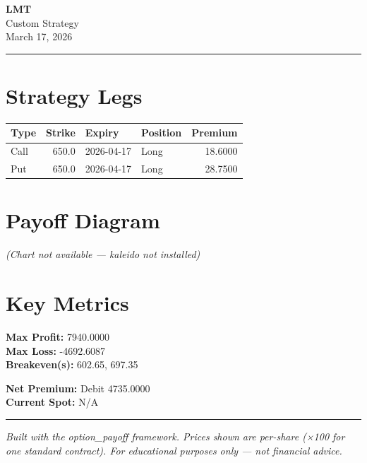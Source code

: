 \documentclass{article}
\begin{document}
\begin{flushright}
  {\large\textbf{LMT}} \\[2pt]
  {\normalsize Custom Strategy} \\[2pt]
  {\small March 17, 2026}
\end{flushright}

\noindent\rule{\linewidth}{0.5pt}
\vspace{6pt}

\section*{Strategy Legs}
\begin{tabular}{@{}lrllr@{}}
  \toprule
  \textbf{Type} & \textbf{Strike} & \textbf{Expiry} & \textbf{Position} & \textbf{Premium} \\
  \midrule
  Call & 650.0 & 2026-04-17 & Long & 18.6000 \\
  Put & 650.0 & 2026-04-17 & Long & 28.7500 \\
  \bottomrule
\end{tabular}

\vspace{14pt}

\section*{{Payoff Diagram}}
\begin{{center}}
  \textit{{(Chart not available — kaleido not installed)}}
\end{{center}}

\vspace{{10pt}}

\section*{Key Metrics}
\noindent
\begin{minipage}[t]{0.48\linewidth}
  \textbf{Max Profit:}    7940.0000 \\[4pt]
  \textbf{Max Loss:}      -4692.6087 \\[4pt]
  \textbf{Breakeven(s):}  602.65, 697.35
\end{minipage}\hfill
\begin{minipage}[t]{0.48\linewidth}
  \textbf{Net Premium:}   Debit 4735.0000 \\[4pt]
  \textbf{Current Spot:}  N/A
\end{minipage}

\vspace{14pt}
\noindent\rule{\linewidth}{0.5pt}
\vspace{4pt}

\begin{center}
  \small\textit{Built with the option\_payoff framework. Prices shown are per-share (×100 for one standard contract). For educational purposes only --- not financial advice.}
\end{center}
\end{document}
